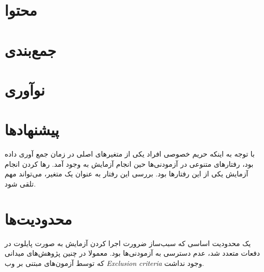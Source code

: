 \section{محتوا}

\section{جمع‌بندی}

\section{نوآوری}

\section{پیشنهادها}
با  توجه به اینکه  حریم خصوصی افراد یکی از متغیر‌های اصلی در زمان جمع آوری
داده بود، رفتار‌های متنوعی در آزمودنی‌ها حین انجام آزمایش به وجود
آمد. رها کردن انجام آزمایش یکی از این رفتار‌ها
بود. بررسی این رفتار به عنوان یک متغیر، می‌تواند مهم تلقی شود.

\section{محدودیت‌ها}
یک محدودیت اساسی  که سبب‌ساز ضرورت اجرا کردن آزمایش به صورت
پایلوت در دفعات متعدد شد، عدم دسترسی به آزمودنی‌ها بود. معمولا
در چنین پژوهش‌های میدانی که توسط آزمون‌های مبتنی بر وب
\textit{
    \gls{Exclusion criteria}
}
وجود نداشت.


